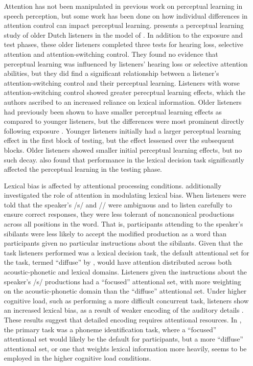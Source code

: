 Attention has not been manipulated in previous work on perceptual learning in speech perception, but some work has been done on how individual differences in attention control can impact perceptual learning.
\citet{Scharenborg2014} presents a perceptual learning study of older Dutch listeners in the model of \citet{Norris2003}.  
In addition to the exposure and test phases, these older listeners completed three tests for hearing loss, selective attention and attention-switching control.  
They found no evidence that perceptual learning was influenced by listeners' hearing loss or selective attention abilities, but they did find a significant relationship between a listener's attention-switching control and their perceptual learning.  
Listeners with worse attention-switching control showed greater perecptual learning effects, which the authors ascribed to an increased reliance on lexical information.  
Older listeners had previously been shown to have smaller perceptual learning effects as compared to younger listeners, but the differences were most prominent directly following exposure \citep{Scharenborg2013}.  
Younger listeners initially had a larger perceptual learning effect in the first block of testing, but the effect lessened over the subsequent blocks.  
Older listeners showed smaller initial perceptual learning effects, but no such decay.  
\citet{Scharenborg2013} also found that performance in the lexical decision task significantly affected the perceptual learning in the testing phase.

Lexical bias is affected by attentional processing conditions.
\citet{Pitt2012} additionally investigated the role of attention in modulating lexical bias.  
When listeners were told that the speaker's /s/ and /\textesh/ were ambiguous and to listen carefully to ensure correct responses, they were less tolerant of noncanonical productions across all positions in the word.  
That is, participants attending to the speaker's sibilants were less likely to accept the modified production as a word than participants given no particular instructions about the sibilants.
Given that the task listeners performed was a lexical decision task, the default attentional set for the task, termed ``diffuse'' by \citet{Pitt2012}, would have attention distributed across both acoustic-phonetic and lexical domains.  Listeners given the instructions about the speaker's /s/ productions had a ``focused'' attentional set, with more weighting on the acoustic-phonetic domain than the ``diffuse'' attentional set.
Under higher cognitive load, such as performing a more difficult concurrent task, listeners show an increased lexical bias, as a result of weaker encoding of the auditory details \citep{Mattys2011}.  These results suggest that detailed encoding requires attentional resources.  In \citet{Mattys2011}, the primary task was a phoneme identification task, where a ``focused'' attentional set would likely be the default for participants, but a more ``diffuse'' attentional set, or one that weights lexical information more heavily, seems to be employed in the higher cognitive load conditions.

